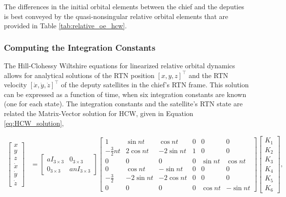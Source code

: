 The differences in the initial orbital elements between the chief and the deputies is best conveyed by the quasi-nonsingular relative orbital elements that are provided in Table \ref{tab:relative_oe_hcw}.

\subsubsection{Computing the Integration Constants}

The Hill-Clohessy Wiltshire equations for linearized relative orbital dynamics allows for analytical solutions of the RTN position $[x, y, z]^\top$ and the RTN velocity $[\dot{x}, \dot{y}, \dot{z}]^\top$ of the deputy satellites in the chief's RTN frame. This solution can be expressed as a function of time, when six integration constants are known (one for each state). The integration constants and the satellite's RTN state are related the Matrix-Vector solution for HCW, given in Equation \ref{eq:HCW_solution}, 


\begin{align} \label{eq:HCW_solution}
\begin{bmatrix}
x \\ y \\ z \\ \dot{x} \\ \dot{y} \\ \dot{z}
\end{bmatrix}
&=
\begin{bmatrix}
a I_{3 \times 3} & 0_{3 \times 3} \\
0_{3 \times 3} & a n I_{3 \times 3}
\end{bmatrix}
\begin{bmatrix}
1 & \sin nt & \cos nt & 0 & 0 & 0 \\
-\frac{3}{2}nt & 2 \cos nt & -2 \sin nt & 1 & 0 & 0 \\
0 & 0 & 0 & 0 & \sin nt & \cos nt \\
0 & \cos nt & -\sin nt & 0 & 0 & 0 \\
-\frac{3}{2} & -2 \sin nt & -2 \cos nt & 0 & 0 & 0 \\
0 & 0 & 0 & 0 & \cos nt & -\sin nt
\end{bmatrix}
\begin{bmatrix}
K_1 \\ K_2 \\ K_3 \\ K_4 \\ K_5 \\ K_6
\end{bmatrix},
\end{align}

